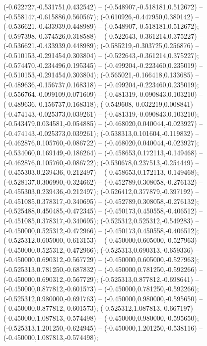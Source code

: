  (-0.622727,-0.531751,0.432542) -- (-0.548907,-0.518181,0.512672) -- (-0.558147,-0.615886,0.560567);
 (-0.610926,-0.447950,0.380142) -- (-0.536621,-0.433939,0.448989) -- (-0.548907,-0.518181,0.512672);
 (-0.597398,-0.374526,0.318588) -- (-0.522643,-0.361214,0.375227) -- (-0.536621,-0.433939,0.448989);
 (-0.585219,-0.303725,0.256876) -- (-0.510153,-0.291454,0.303804) -- (-0.522643,-0.361214,0.375227);
 (-0.574470,-0.234496,0.195345) -- (-0.499204,-0.223460,0.235019) -- (-0.510153,-0.291454,0.303804);
 (-0.565021,-0.166418,0.133685) -- (-0.489636,-0.156737,0.168318) -- (-0.499204,-0.223460,0.235019);
 (-0.556764,-0.099109,0.071609) -- (-0.481319,-0.090843,0.103210) -- (-0.489636,-0.156737,0.168318);
 (-0.549608,-0.032219,0.008841) -- (-0.474143,-0.025373,0.039261) -- (-0.481319,-0.090843,0.103210);
 (-0.543479,0.034581,-0.054885) -- (-0.468020,0.040044,-0.023927) -- (-0.474143,-0.025373,0.039261);
 (-0.538313,0.101604,-0.119832) -- (-0.462876,0.105760,-0.086722) -- (-0.468020,0.040044,-0.023927);
 (-0.534060,0.169149,-0.186264) -- (-0.458653,0.172113,-0.149468) -- (-0.462876,0.105760,-0.086722);
 (-0.530678,0.237513,-0.254449) -- (-0.455303,0.239436,-0.212497) -- (-0.458653,0.172113,-0.149468);
 (-0.528137,0.306990,-0.324662) -- (-0.452789,0.308058,-0.276132) -- (-0.455303,0.239436,-0.212497);
 (-0.526412,0.377879,-0.397192) -- (-0.451085,0.378317,-0.340695) -- (-0.452789,0.308058,-0.276132);
 (-0.525488,0.450485,-0.472345) -- (-0.450173,0.450558,-0.406512) -- (-0.451085,0.378317,-0.340695);
 (-0.525312,0.525312,-0.549283) -- (-0.450000,0.525312,-0.472966) -- (-0.450173,0.450558,-0.406512);
 (-0.525312,0.605000,-0.613153) -- (-0.450000,0.605000,-0.527963) -- (-0.450000,0.525312,-0.472966);
 (-0.525313,0.690313,-0.659336) -- (-0.450000,0.690312,-0.567729) -- (-0.450000,0.605000,-0.527963);
 (-0.525313,0.781250,-0.687832) -- (-0.450000,0.781250,-0.592266) -- (-0.450000,0.690312,-0.567729);
 (-0.525313,0.877812,-0.698641) -- (-0.450000,0.877812,-0.601573) -- (-0.450000,0.781250,-0.592266);
 (-0.525312,0.980000,-0.691763) -- (-0.450000,0.980000,-0.595650) -- (-0.450000,0.877812,-0.601573);
 (-0.525312,1.087813,-0.667197) -- (-0.450000,1.087813,-0.574498) -- (-0.450000,0.980000,-0.595650);
 (-0.525313,1.201250,-0.624945) -- (-0.450000,1.201250,-0.538116) -- (-0.450000,1.087813,-0.574498);
